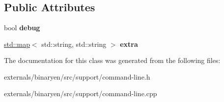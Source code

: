 \subsection*{Public Attributes}
\begin{DoxyCompactItemize}
\item 
\mbox{\label{classwasm_1_1_options_a442987a49f5a31121834e2150b08e05e}} 
bool {\bfseries debug}
\item 
\mbox{\label{classwasm_1_1_options_a3fd1911174e9c7256f216bd487233de6}} 
\mbox{\hyperlink{classstd_1_1map}{std\+::map}}$<$ std\+::string, std\+::string $>$ {\bfseries extra}
\end{DoxyCompactItemize}


The documentation for this class was generated from the following files\+:\begin{DoxyCompactItemize}
\item 
externals/binaryen/src/support/command-\/line.\+h\item 
externals/binaryen/src/support/command-\/line.\+cpp\end{DoxyCompactItemize}
